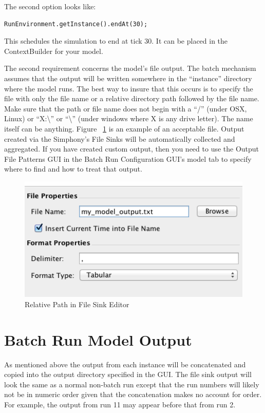\documentclass[11pt]{amsart}
\begin{document}
The second option looks like:

\begin{verbatim}
RunEnvironment.getInstance().endAt(30);
\end{verbatim}
\noindent
This schedules the simulation to end at tick 30. It can be placed in the ContextBuilder for your model.

The second requirement concerns the model's file output. The batch mechanism assumes that the output will be written somewhere in the ``instance'' directory where the model runs. The best way to insure that this occurs is to specify the file with only the file name or a relative directory path followed by the file name. Make sure that the path or file name does not begin with a ``/'' (under OSX, Linux) or ``X:\textbackslash'' or ``\textbackslash'' (under windows where X is any drive letter). The name itself can be anything. Figure ~\ref{fig:file_name} is an example of an acceptable file. Output created via the Simphony's File Sinks will be automatically collected and aggregated. If you have created custom output, then you need to use the Output File Patterns GUI in the Batch Run Configuration GUI's model tab to specify where to find and how to treat that output.

\begin{figure}[h]
\begin{center}
\vspace{.2in}
\centerline {
\includegraphics[width=6in]{images/file_name.png}
}
\caption{Relative Path in File Sink Editor}
\label{fig:file_name}
\end{center}
\end{figure}

\section{Batch Run Model Output}
As mentioned above the output from each instance will be concatenated and copied into the output directory specified in the GUI. The file sink output will look the same as a normal non-batch run except that the run numbers will likely not be in numeric order given that the concatenation makes no account for order. For example, the output from run 11 may appear before that from run 2.
\end{document}
